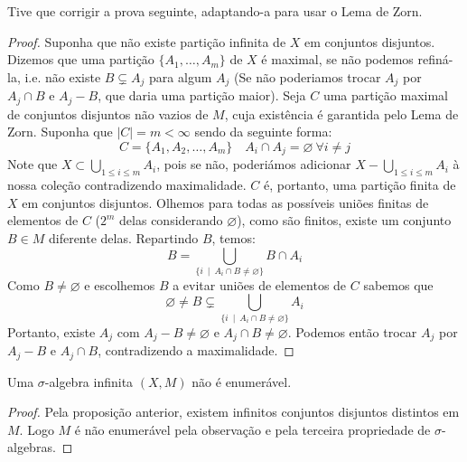 Tive que corrigir a prova seguinte, adaptando-a para usar o Lema de Zorn.
\begin{proof}
    
    Suponha que não existe partição infinita de $X$ em conjuntos disjuntos. Dizemos que uma partição $\{A_1,\dots, A_m\}$ de $X$ é maximal, se não podemos refiná-la, i.e.
    não existe $B \subsetneq A_j$ para algum $A_j$ (Se não poderiamos trocar $A_j$ por $A_j \cap B$ e $A_j - B$, que daria uma partição maior).
    Seja $C$ uma partição maximal de conjuntos disjuntos não vazios de $M$, cuja existência é garantida pelo Lema de Zorn. Suponha que $|C| = m < \infty$ sendo da seguinte forma:
    $$C = \{A_1, A_2, \dots, A_m \} \quad A_i \cap A_j = \varnothing \ \forall i\neq j$$
    Note que $X \subset \bigcup_{1 \leq i \leq m} A_i$, pois se não, poderiámos adicionar $X - \bigcup_{1 \leq i \leq m} A_i$ à nossa coleção contradizendo maximalidade.
    $C$ é, portanto, uma partição finita de $X$ em conjuntos disjuntos. Olhemos para todas as possíveis uniões finitas de elementos de $C$ ($2^m$ delas considerando $\varnothing$), 
    como são finitos, existe um conjunto $B \in M$ diferente delas. Repartindo $B$, temos:
    $$B = \bigcup_{\{i\ \mid \ A_i \cap B \neq \varnothing \}} B \cap A_i$$
    Como $B \neq \varnothing$ e escolhemos $B$ a evitar uniões de elementos de $C$ sabemos que
    $$\varnothing \neq B \subsetneq \bigcup_{\{i\ \mid \ A_i \cap B \neq \varnothing \}} A_i$$
    Portanto, existe $A_j$ com $A_j - B \neq \varnothing$ e $A_j \cap B \neq \varnothing$. Podemos então trocar $A_j$ por $A_j - B$ e $A_j \cap B$,
    contradizendo a maximalidade.
\end{proof}
\begin{corollary}
    Uma $\sigma$-algebra infinita $(X,M)$ não é enumerável.
\end{corollary}
\begin{proof}
    Pela proposição anterior, existem infinitos conjuntos disjuntos distintos em $M$. Logo $M$ é não enumerável pela observação e pela terceira
    propriedade de $\sigma$-algebras.
\end{proof}

